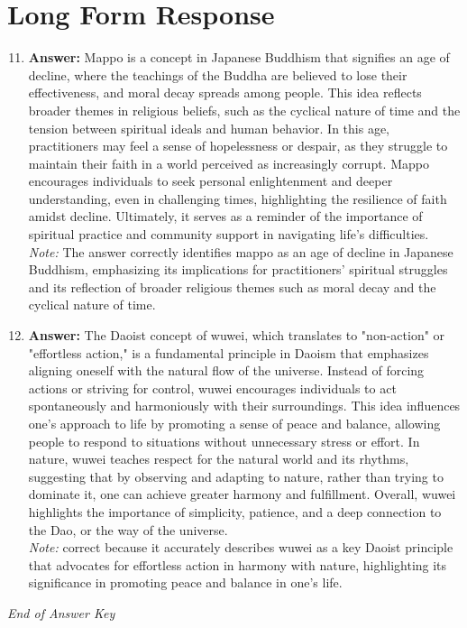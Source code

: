 \documentclass[12pt]{article}
\begin{document}
\section*{Long Form Response}
\begin{enumerate}[label=\arabic*.]
\setcounter{enumi}{10}
\item \textbf{Answer:} Mappo is a concept in Japanese Buddhism that signifies an age of decline, where the teachings of the Buddha are believed to lose their effectiveness, and moral decay spreads among people. This idea reflects broader themes in religious beliefs, such as the cyclical nature of time and the tension between spiritual ideals and human behavior. In this age, practitioners may feel a sense of hopelessness or despair, as they struggle to maintain their faith in a world perceived as increasingly corrupt. Mappo encourages individuals to seek personal enlightenment and deeper understanding, even in challenging times, highlighting the resilience of faith amidst decline. Ultimately, it serves as a reminder of the importance of spiritual practice and community support in navigating life's difficulties.
\\ \textit{Note:} The answer correctly identifies mappo as an age of decline in Japanese Buddhism, emphasizing its implications for practitioners' spiritual struggles and its reflection of broader religious themes such as moral decay and the cyclical nature of time.
\item \textbf{Answer:} The Daoist concept of wuwei, which translates to "non-action" or "effortless action," is a fundamental principle in Daoism that emphasizes aligning oneself with the natural flow of the universe. Instead of forcing actions or striving for control, wuwei encourages individuals to act spontaneously and harmoniously with their surroundings. This idea influences one's approach to life by promoting a sense of peace and balance, allowing people to respond to situations without unnecessary stress or effort. In nature, wuwei teaches respect for the natural world and its rhythms, suggesting that by observing and adapting to nature, rather than trying to dominate it, one can achieve greater harmony and fulfillment. Overall, wuwei highlights the importance of simplicity, patience, and a deep connection to the Dao, or the way of the universe.
\\ \textit{Note:} correct because it accurately describes wuwei as a key Daoist principle that advocates for effortless action in harmony with nature, highlighting its significance in promoting peace and balance in one's life.
\end{enumerate}

\vfill
\noindent\textit{End of Answer Key}
\end{document}
